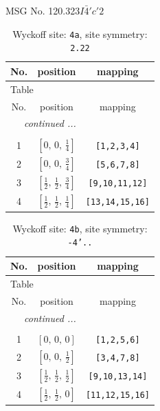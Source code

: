 \documentclass[fleqn,8pt]{jsarticle}
\begin{document}
\setcounter{MaxMatrixCols}{32}

\renewcommand{\tablename}{Table~}
\renewcommand{\figurename}{Figure~}
\begin{center}
\LARGE
MSG No. 120.323\quad$I\bar{4}'c'2$
\end{center}
\renewcommand{\arraystretch}{1.2}
\begin{longtable}{ccc}
\caption{Wyckoff site: {\tt 4a}, site symmetry: {\tt 2.22}}
 \\
 \hline \hline
No. & position & mapping \\ \hline \endfirsthead

\multicolumn{2}{l}{\tablename\ \thetable{}} \\
 \hline \hline
No. & position & mapping \\ \hline \endhead

 \hline \hline
\multicolumn{2}{r}{\footnotesize\it continued ...} \\ \endfoot

 \hline \hline
\multicolumn{2}{r}{} \\ \endlastfoot

1 & $\left[ 0,\, 0,\, \frac{1}{4} \right]$ & {\tt [1,2,3,4]} \\ \hline
2 & $\left[ 0,\, 0,\, \frac{3}{4} \right]$ & {\tt [5,6,7,8]} \\ \hline
3 & $\left[ \frac{1}{2},\, \frac{1}{2},\, \frac{3}{4} \right]$ & {\tt [9,10,11,12]} \\ \hline
4 & $\left[ \frac{1}{2},\, \frac{1}{2},\, \frac{1}{4} \right]$ & {\tt [13,14,15,16]} \\
\end{longtable}
\renewcommand{\arraystretch}{1.2}
\begin{longtable}{ccc}
\caption{Wyckoff site: {\tt 4b}, site symmetry: {\tt -4'..}}
 \\
 \hline \hline
No. & position & mapping \\ \hline \endfirsthead

\multicolumn{2}{l}{\tablename\ \thetable{}} \\
 \hline \hline
No. & position & mapping \\ \hline \endhead

 \hline \hline
\multicolumn{2}{r}{\footnotesize\it continued ...} \\ \endfoot

 \hline \hline
\multicolumn{2}{r}{} \\ \endlastfoot

1 & $\left[ 0,\, 0,\, 0 \right]$ & {\tt [1,2,5,6]} \\ \hline
2 & $\left[ 0,\, 0,\, \frac{1}{2} \right]$ & {\tt [3,4,7,8]} \\ \hline
3 & $\left[ \frac{1}{2},\, \frac{1}{2},\, \frac{1}{2} \right]$ & {\tt [9,10,13,14]} \\ \hline
4 & $\left[ \frac{1}{2},\, \frac{1}{2},\, 0 \right]$ & {\tt [11,12,15,16]} \\
\end{longtable}
\end{document}
